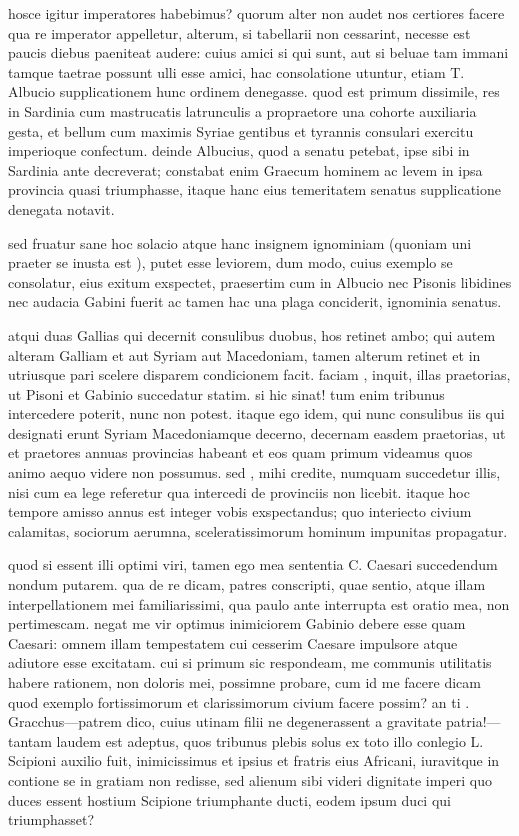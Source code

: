  hosce igitur imperatores habebimus? quorum alter non audet nos certiores facere qua re imperator appelletur, alterum, si tabellarii non cessarint, necesse est paucis diebus paeniteat audere: cuius amici si qui sunt, aut si beluae tam immani tamque taetrae possunt ulli esse amici, hac consolatione utuntur, etiam T. Albucio supplicationem hunc ordinem denegasse. quod est primum dissimile, res in Sardinia cum mastrucatis latrunculis a propraetore una cohorte auxiliaria gesta, et bellum cum maximis Syriae gentibus et tyrannis consulari exercitu imperioque confectum. deinde Albucius, quod a senatu petebat, ipse sibi in Sardinia ante decreverat; constabat enim Graecum hominem ac levem in ipsa provincia quasi triumphasse, itaque hanc eius temeritatem senatus supplicatione denegata notavit.

 sed fruatur sane hoc solacio atque hanc insignem ignominiam (quoniam uni praeter se inusta est ), putet esse leviorem, dum modo, cuius exemplo se consolatur, eius exitum exspectet, praesertim cum in Albucio nec Pisonis libidines nec audacia Gabini fuerit ac tamen hac una plaga conciderit, ignominia senatus.

 atqui duas Gallias qui decernit consulibus duobus, hos retinet ambo; qui autem alteram Galliam et aut Syriam aut Macedoniam, tamen alterum retinet et in utriusque pari scelere disparem condicionem facit. faciam , inquit, illas praetorias, ut Pisoni et Gabinio succedatur statim. si hic sinat! tum enim tribunus intercedere poterit, nunc non potest. itaque ego idem, qui nunc consulibus iis qui designati erunt Syriam Macedoniamque decerno, decernam easdem praetorias, ut et praetores annuas provincias habeant et eos quam primum videamus quos animo aequo videre non possumus. sed , mihi credite, numquam succedetur illis, nisi cum ea lege referetur qua intercedi de provinciis non licebit. itaque hoc tempore amisso annus est integer vobis exspectandus; quo interiecto civium calamitas, sociorum aerumna, sceleratissimorum hominum impunitas propagatur.

 quod si essent illi optimi viri, tamen ego mea sententia C. Caesari succedendum nondum putarem. qua de re dicam, patres conscripti, quae sentio, atque illam interpellationem mei familiarissimi, qua paulo ante interrupta est oratio mea, non pertimescam. negat me vir optimus inimiciorem Gabinio debere esse quam Caesari: omnem illam tempestatem cui cesserim Caesare impulsore atque adiutore esse excitatam. cui si primum sic respondeam, me communis utilitatis habere rationem, non doloris mei, possimne probare, cum id me facere dicam quod exemplo fortissimorum et clarissimorum civium facere possim? an ti . Gracchus—patrem dico, cuius utinam filii ne degenerassent a gravitate patria!—tantam laudem est adeptus, quos tribunus plebis solus ex toto illo conlegio L. Scipioni auxilio fuit, inimicissimus et ipsius et fratris eius Africani, iuravitque in contione se in gratiam non redisse, sed alienum sibi videri dignitate imperi quo duces essent hostium Scipione triumphante ducti, eodem ipsum duci qui triumphasset?

